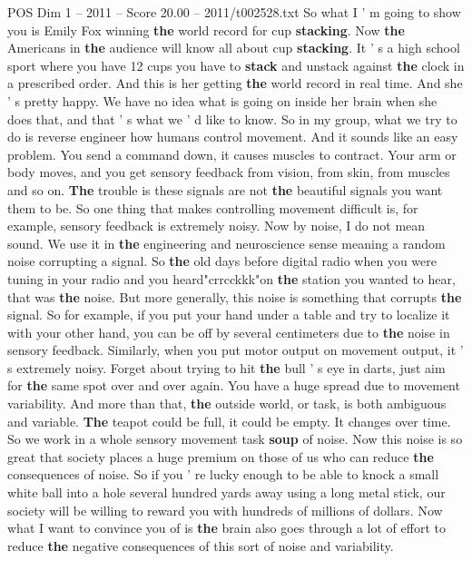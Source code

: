 \begin{textsample}{POS Dim 1 – 2011 – Score 20.00 – 2011/t002528.txt}
So what I ' m going to show you is Emily Fox winning \textbf{the} world record for cup \textbf{stacking}.
Now \textbf{the} Americans in \textbf{the} audience will know all about cup \textbf{stacking}.
It ' s a high school sport where you have 12 cups you have to \textbf{stack} and unstack against \textbf{the} clock in a prescribed order.
And this is her getting \textbf{the} world record in real time.
And she ' s pretty happy.
We have no idea what is going on inside her brain when she does that, and that ' s what we ' d like to know.
So in my group, what we try to do is reverse engineer how humans control movement.
And it sounds like an easy problem.
You send a command down, it causes muscles to contract.
Your arm or body moves, and you get sensory feedback from vision, from skin, from muscles and so on. \textbf{The} trouble is these signals are not \textbf{the} beautiful signals you want them to be.
So one thing that makes controlling movement difficult is, for example, sensory feedback is extremely noisy.
Now by noise, I do not mean sound.
We use it in \textbf{the} engineering and neuroscience sense meaning a random noise corrupting a signal.
So \textbf{the} old days before digital radio when you were tuning in your radio and you heard"crrcckkk"on \textbf{the} station you wanted to hear, that was \textbf{the} noise.
But more generally, this noise is something that corrupts \textbf{the} signal.
So for example, if you put your hand under a table and try to localize it with your other hand, you can be off by several centimeters due to \textbf{the} noise in sensory feedback.
Similarly, when you put motor output on movement output, it ' s extremely noisy.
Forget about trying to hit \textbf{the} bull ' s eye in darts, just aim for \textbf{the} same spot over and over again.
You have a huge spread due to movement variability.
And more than that, \textbf{the} outside world, or task, is both ambiguous and variable. \textbf{The} teapot could be full, it could be empty.
It changes over time.
So we work in a whole sensory movement task \textbf{soup} of noise.
Now this noise is so great that society places a huge premium on those of us who can reduce \textbf{the} consequences of noise.
So if you ' re lucky enough to be able to knock a small white ball into a hole several hundred yards away using a long metal stick, our society will be willing to reward you with hundreds of millions of dollars.
Now what I want to convince you of is \textbf{the} brain also goes through a lot of effort to reduce \textbf{the} negative consequences of this sort of noise and variability.

\end{textsample}

